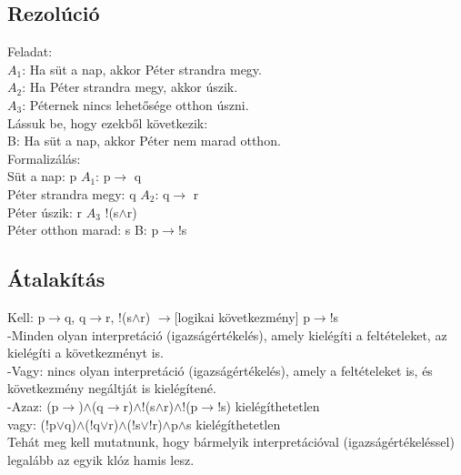 \documentclass{article}
\begin{document}
	\subsection{Rezolúció}
	Feladat:\\
	$A_1$: Ha süt a nap, akkor Péter strandra megy.\\
	$A_2$: Ha Péter strandra megy, akkor úszik.\\
	$A_3$: Péternek nincs lehetősége otthon úszni.\\
	Lássuk be, hogy ezekből következik:\\
	B: Ha süt a nap, akkor Péter nem marad otthon.\\
	Formalizálás:\\
	Süt a nap: \hspace{5em} p \hspace{1em}$A_1$: p$\rightarrow$ q\\
	Péter strandra megy: \hspace{0,3em} q\hspace{1em} $A_2$: q$\rightarrow$ r\\
	Péter úszik: \hspace{4,5em} r \hspace{1em}$A_3$ !(s$\wedge$r)\\
	Péter otthon marad: \hspace{0,7em} s\hspace{1em} B: p$\rightarrow$!s\\
	
	\subsection{Átalakítás}
	Kell: p$\rightarrow$q, q$\rightarrow$r, !(s$\wedge$r) $\rightarrow$[logikai következmény] p$\rightarrow$!s\\
	-Minden olyan interpretáció (igazságértékelés), amely kielégíti a feltételeket, az kielégíti a következményt is.\\
	-Vagy: nincs olyan interpretáció (igazságértékelés), amely a feltételeket is, és következmény negáltját is kielégítené.\\
	-Azaz: (p$\rightarrow$)$\wedge$(q$\rightarrow$r)$\wedge$!(s$\wedge$r)$\wedge$!(p$\rightarrow$!s) kielégíthetetlen\\
	 vagy: (!p$\vee$q)$\wedge$(!q$\vee$r)$\wedge$(!s$\vee$!r)$\wedge$p$\wedge$s kielégíthetetlen\\
	 Tehát meg kell mutatnunk, hogy bármelyik interpretációval (igazságértékeléssel) legalább az egyik klóz hamis lesz.
	 
\end{document}
